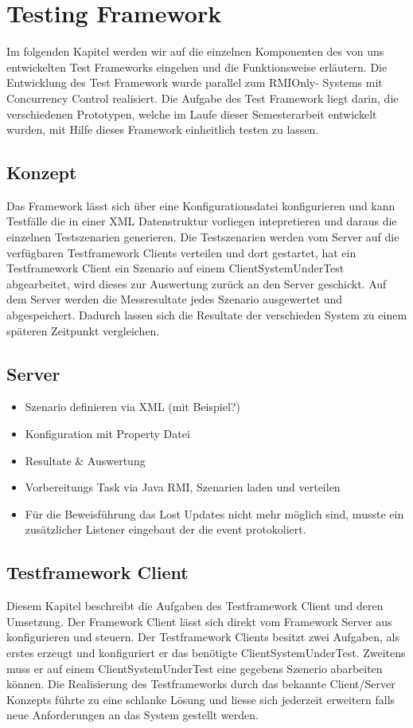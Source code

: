\section{Testing Framework}
\label{sec:testing Framework}
Im folgenden Kapitel werden wir auf die einzelnen Komponenten des von uns entwickelten Test Frameworks eingehen und die Funktionsweise erläutern. Die Entwicklung des Test Framework wurde parallel zum RMIOnly- Systems mit Concurrency Control realisiert. Die Aufgabe des Test Framework liegt darin, die verschiedenen Prototypen, welche im Laufe dieser Semesterarbeit entwickelt wurden, mit Hilfe dieses Framework einheitlich testen zu lassen.


\subsection{Konzept}
Das Framework lässt sich über eine Konfigurationsdatei konfigurieren und kann Testfälle die in einer XML Datenstruktur vorliegen intepretieren und daraus die einzelnen Testszenarien generieren. Die Testszenarien werden vom Server auf die verfügbaren Testframework Clients verteilen und dort gestartet, hat ein Testframework Client ein Szenario auf einem ClientSystemUnderTest abgearbeitet, wird dieses zur Auswertung zurück an den Server geschickt. Auf dem Server werden die Messresultate jedes Szenario ausgewertet und abgespeichert. Dadurch lassen sich die Resultate der verschieden System zu einem späteren Zeitpunkt vergleichen.


\subsection{Server}
\label{sec:test-FW Server}
\begin{itemize}
\item Szenario definieren via XML (mit Beispiel?)
\item Konfiguration mit Property Datei
\item Resultate \& Auswertung
\item Vorbereitungs Task via Java RMI, Szenarien laden und verteilen
\item Für die Beweisführung das Lost Updates nicht mehr möglich sind, musste ein zusätzlicher Listener eingebaut der die event protokoliert.
\end{itemize}

\subsection{Testframework Client}
\label{sec:test-FW Client}
Diesem Kapitel beschreibt die Aufgaben des Testframework Client und deren Umsetzung. Der Framework Client lässt sich direkt vom Framework Server aus konfigurieren und steuern. Der Testframework Clients besitzt zwei Aufgaben, als erstes erzeugt und konfiguriert er das benötigte ClientSystemUnderTest. Zweitens muss er auf einem ClientSystemUnderTest eine gegebens Szenerio abarbeiten können. Die Realisierung des Testframeworks durch das bekannte Client/Server Konzepts führte zu eine schlanke Lösung und liesse sich jederzeit erweitern falls neue Anforderungen an das System gestellt werden.


